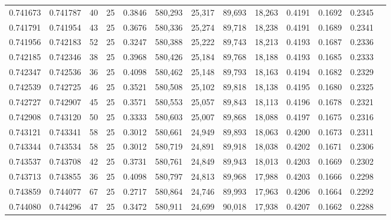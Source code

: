 \begin{tabular}{rrrrrrrrrrrrr}
0.741673 & 0.741787 &    40 &  25 &                                     0.3846 & 580,293 &  25,317 &  89,693 &  18,263 & 0.4191 & 0.1692 & 0.2345 \\
0.741791 & 0.741954 &    43 &  25 &                                     0.3676 & 580,336 &  25,274 &  89,718 &  18,238 & 0.4191 & 0.1689 & 0.2341 \\
0.741956 & 0.742183 &    52 &  25 &                                     0.3247 & 580,388 &  25,222 &  89,743 &  18,213 & 0.4193 & 0.1687 & 0.2336 \\
0.742185 & 0.742346 &    38 &  25 &                                     0.3968 & 580,426 &  25,184 &  89,768 &  18,188 & 0.4193 & 0.1685 & 0.2333 \\
0.742347 & 0.742536 &    36 &  25 &                                     0.4098 & 580,462 &  25,148 &  89,793 &  18,163 & 0.4194 & 0.1682 & 0.2329 \\
0.742539 & 0.742725 &    46 &  25 &                                     0.3521 & 580,508 &  25,102 &  89,818 &  18,138 & 0.4195 & 0.1680 & 0.2325 \\
0.742727 & 0.742907 &    45 &  25 &                                     0.3571 & 580,553 &  25,057 &  89,843 &  18,113 & 0.4196 & 0.1678 & 0.2321 \\
0.742908 & 0.743120 &    50 &  25 &                                     0.3333 & 580,603 &  25,007 &  89,868 &  18,088 & 0.4197 & 0.1675 & 0.2316 \\
0.743121 & 0.743341 &    58 &  25 &                                     0.3012 & 580,661 &  24,949 &  89,893 &  18,063 & 0.4200 & 0.1673 & 0.2311 \\
0.743344 & 0.743534 &    58 &  25 &                                     0.3012 & 580,719 &  24,891 &  89,918 &  18,038 & 0.4202 & 0.1671 & 0.2306 \\
0.743537 & 0.743708 &    42 &  25 &                                     0.3731 & 580,761 &  24,849 &  89,943 &  18,013 & 0.4203 & 0.1669 & 0.2302 \\
0.743713 & 0.743855 &    36 &  25 &                                     0.4098 & 580,797 &  24,813 &  89,968 &  17,988 & 0.4203 & 0.1666 & 0.2298 \\
0.743859 & 0.744077 &    67 &  25 &                                     0.2717 & 580,864 &  24,746 &  89,993 &  17,963 & 0.4206 & 0.1664 & 0.2292 \\
0.744080 & 0.744296 &    47 &  25 &                                     0.3472 & 580,911 &  24,699 &  90,018 &  17,938 & 0.4207 & 0.1662 & 0.2288 \\

\end{tabular}
